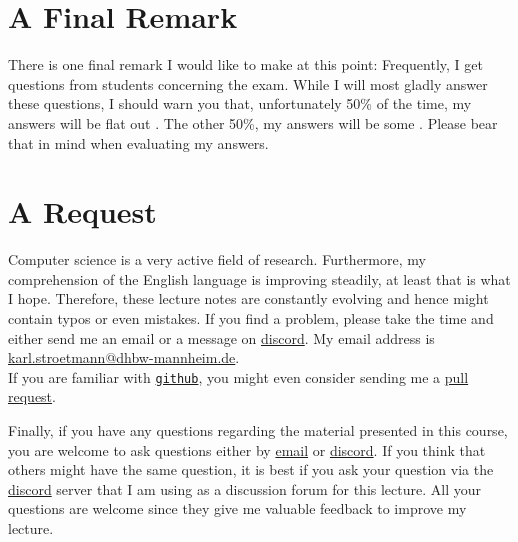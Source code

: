 \section{A Final Remark}
There is one final remark I would like to make at this point:  Frequently, I get questions from
students concerning the exam.  While I will most gladly  answer these questions, I should warn you
that, unfortunately 50\%
of the time, my answers will be flat out  .  The other 50\%,
my answers will be some  .  Please bear that in mind when evaluating my answers. 

\section{A Request}
Computer science is a very active field of research.  Furthermore, my comprehension of the English
language is improving steadily, at least that is what I hope.  Therefore, these lecture notes are constantly
evolving and hence might contain typos or even mistakes.  If you find a problem,
please take the time and either send me an email or a message on
\href{https://discordapp.com/users/110511107520643072}{discord}.  My email address is 
\\[0.2cm]
\hspace*{1.3cm}
\href{mailto:karl.stroetmann@dhbw-mannheim.de}{karl.stroetmann@dhbw-mannheim.de}.
\\[0.2cm]
If you are familiar with \href{http://github.com}{\texttt{github}}, you might even consider
sending me a \href{https://help.github.com/articles/using-pull-requests}{pull request}.

Finally, if you have any questions regarding the material presented in this course, you are
welcome to ask questions either by \href{mailto:karl.stroetmann@dhbw-mannheim.de}{email} or
\href{https://discordapp.com}{discord}.  If you think that others might
have the same question, it is best if you ask your question via the \href{https://discordapp.com}{discord}
server that I am using as a discussion forum for this lecture.  All your questions are welcome since they give
me valuable feedback   to improve my lecture. 

